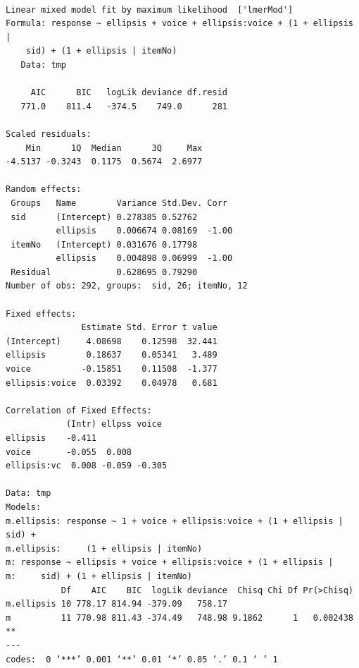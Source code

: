 \documentclass[11pt]{article}
\begin{document}
\begin{verbatim}

Linear mixed model fit by maximum likelihood  ['lmerMod']
Formula: response ~ ellipsis + voice + ellipsis:voice + (1 + ellipsis |  
    sid) + (1 + ellipsis | itemNo)
   Data: tmp

     AIC      BIC   logLik deviance df.resid 
   771.0    811.4   -374.5    749.0      281 

Scaled residuals: 
    Min      1Q  Median      3Q     Max 
-4.5137 -0.3243  0.1175  0.5674  2.6977 

Random effects:
 Groups   Name        Variance Std.Dev. Corr 
 sid      (Intercept) 0.278385 0.52762       
          ellipsis    0.006674 0.08169  -1.00
 itemNo   (Intercept) 0.031676 0.17798       
          ellipsis    0.004898 0.06999  -1.00
 Residual             0.628695 0.79290       
Number of obs: 292, groups:  sid, 26; itemNo, 12

Fixed effects:
               Estimate Std. Error t value
(Intercept)     4.08698    0.12598  32.441
ellipsis        0.18637    0.05341   3.489
voice          -0.15851    0.11508  -1.377
ellipsis:voice  0.03392    0.04978   0.681

Correlation of Fixed Effects:
            (Intr) ellpss voice 
ellipsis    -0.411              
voice       -0.055  0.008       
ellipsis:vc  0.008 -0.059 -0.305

Data: tmp
Models:
m.ellipsis: response ~ 1 + voice + ellipsis:voice + (1 + ellipsis | sid) + 
m.ellipsis:     (1 + ellipsis | itemNo)
m: response ~ ellipsis + voice + ellipsis:voice + (1 + ellipsis | 
m:     sid) + (1 + ellipsis | itemNo)
           Df    AIC    BIC  logLik deviance  Chisq Chi Df Pr(>Chisq)   
m.ellipsis 10 778.17 814.94 -379.09   758.17                            
m          11 770.98 811.43 -374.49   748.98 9.1862      1   0.002438 **
---
codes:  0 ‘***’ 0.001 ‘**’ 0.01 ‘*’ 0.05 ‘.’ 0.1 ‘ ’ 1
\end{verbatim}
\end{document}
